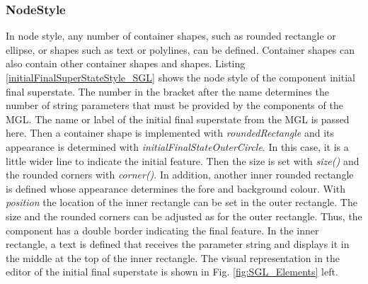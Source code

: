 \subsubsection{NodeStyle}
In node style, any number of container shapes, such as rounded rectangle or ellipse, or shapes such as text or polylines, can be defined. Container shapes can also contain other container shapes and shapes. Listing \ref{initialFinalSuperStateStyle_SGL} shows the node style of the component initial final superstate. The number in the bracket after the name determines the number of string parameters that must be provided by the components of the MGL. The name or label of the initial final superstate from the MGL is passed here. Then a container shape is implemented with \textit{roundedRectangle} and its appearance is determined with \textit{initialFinalStateOuterCircle}. In this case, it is a little wider line to indicate the initial feature. Then the size is set with \textit{size()} and the rounded corners with \textit{corner()}. In addition, another inner rounded rectangle is defined whose appearance determines the fore and background colour. With \textit{position} the location of the inner rectangle can be set in the outer rectangle. The size and the rounded corners can be adjusted as for the outer rectangle. Thus, the component has a double border indicating the final feature. In the inner rectangle, a text is defined that receives the parameter string and displays it in the middle at the top of the inner rectangle. The visual representation in the editor of the initial final superstate is shown in Fig. \ref{fig:SGL_Elements} left.


